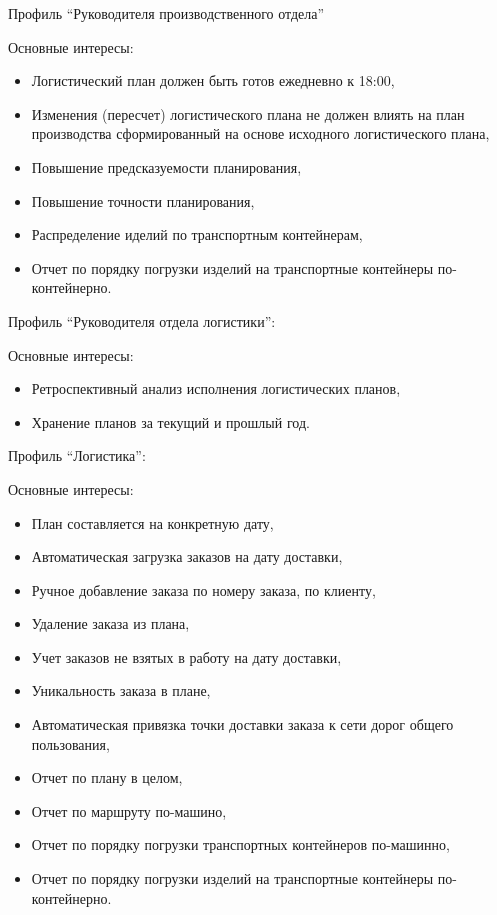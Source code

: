 Профиль ``Руководителя производственного отдела''

Основные интересы:
\begin{itemize}
    \item Логистический план должен быть готов ежедневно к 18:00,
    \item Изменения (пересчет) логистического плана не должен влиять на план производства сформированный на основе исходного логистического плана,
    \item Повышение предсказуемости планирования,
    \item Повышение точности планирования,
    \item Распределение иделий по транспортным контейнерам,
    \item Отчет по порядку погрузки изделий на транспортные контейнеры по-контейнерно.
\end{itemize}

Профиль ``Руководителя отдела логистики'':

Основные интересы:
\begin{itemize}
    \item Ретроспективный анализ исполнения логистических планов,
    \item Хранение планов за текущий и прошлый год.
\end{itemize}

Профиль ``Логистика'':

Основные интересы:
\begin{itemize}
    \item План составляется на конкретную дату,
    \item Автоматическая загрузка заказов на дату доставки,
    \item Ручное добавление заказа по номеру заказа, по клиенту,
    \item Удаление заказа из плана,
    \item Учет заказов не взятых в работу на дату доставки,
    \item Уникальность заказа в плане,
    \item Автоматическая привязка точки доставки заказа к сети дорог общего пользования,
    \item Отчет по плану в целом,
    \item Отчет по маршруту по-машино,
    \item Отчет по порядку погрузки транспортных контейнеров по-машинно,
    \item Отчет по порядку погрузки изделий на транспортные контейнеры по-контейнерно.
\end{itemize}

